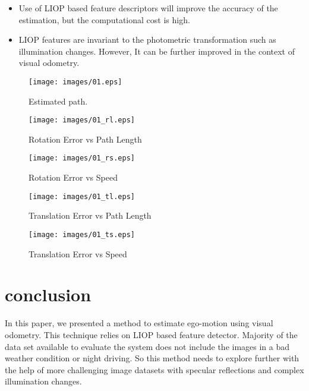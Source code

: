 \documentclass{article}
\begin{document}
\begin{itemize}
\item Use of LIOP based feature descriptors will improve the accuracy of the estimation, but the computational cost is high. 
\item  LIOP features are invariant to the photometric transformation such as illumination changes. However, It can be further improved in the context of visual odometry.
\end{itemize}
\begin{figure}[ht]
 \centering
 \texttt{[image: images/01.eps]}
\caption{Estimated path.}
\label{ep}
\end{figure}
\begin{figure}[H]
    \centering
    \begin{minipage}{.5\textwidth}
    
        \centering
        \texttt{[image: images/01\_rl.eps]}
        \vspace{-1.5em}
        \caption{Rotation Error  vs Path Length}
        \label{rep}
    \end{minipage}%
    \begin{minipage}{0.5\textwidth}
        \centering
        \texttt{[image: images/01\_rs.eps]}
         \vspace{-1.5em}
        \caption{Rotation Error  vs Speed}
        \label{res}
    \end{minipage}
    \centering
    \begin{minipage}{.5\textwidth}
        \centering
        \texttt{[image: images/01\_tl.eps]}
         \vspace{-1.5em}
        \caption{Translation Error  vs Path Length}
        \label{tep}
    \end{minipage}%
    \begin{minipage}{0.5\textwidth}
        \centering
        \texttt{[image: images/01\_ts.eps]}
         \vspace{-1.5em}
        \caption{Translation Error  vs Speed}
        \label{tes}
    \end{minipage}
\end{figure}
\section{conclusion}
 In this paper, we presented a method to estimate ego-motion using visual odometry. This technique relies on  LIOP based feature detector.
Majority of the data set available to evaluate the system does not include the images in a bad weather condition or night driving. So this method needs to explore further with the help of more challenging image datasets with specular reflections and complex illumination changes. 



\end{document}
